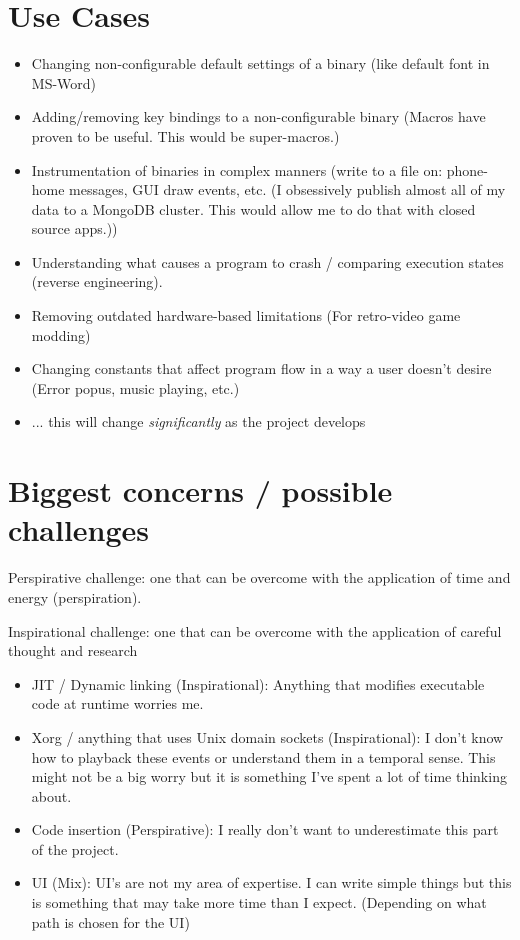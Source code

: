 \section{Use Cases}
\begin{itemize}
    \item Changing non-configurable default settings of a binary (like default font in MS-Word)
    \item Adding/removing key bindings to a non-configurable binary (Macros have proven to be useful. This would be super-macros.)
    \item Instrumentation of binaries in complex manners (write to a file on: phone-home messages, GUI draw events, etc. (I obsessively publish almost all of my data to a MongoDB cluster. This would allow me to do that with closed source apps.))
    \item Understanding what causes a program to crash / comparing execution states (reverse engineering). 
    \item Removing outdated hardware-based limitations (For retro-video game modding)
    \item Changing constants that affect program flow in a way a user doesn't desire (Error popus, music playing, etc.)
    \item ... this will change \textit{significantly} as the project develops
\end{itemize}



\section{Biggest concerns / possible challenges}

Perspirative challenge: one that can be overcome with the application of time and energy (perspiration). 

\noindent Inspirational challenge: one that can be overcome with the application of careful thought and research

\begin{itemize}
    \item JIT / Dynamic linking (Inspirational): Anything that modifies executable code at runtime worries me.
    \item Xorg / anything that uses Unix domain sockets (Inspirational): I don't know how to playback these events or understand them in a temporal sense. This might not be a big worry but it is something I've spent a lot of time thinking about. 
    \item Code insertion (Perspirative): I really don't want to underestimate this part of the project. 
    \item UI (Mix): UI's are not my area of expertise. I can write simple things but this is something that may take more time than I expect. (Depending on what path is chosen for the UI)
\end{itemize}

